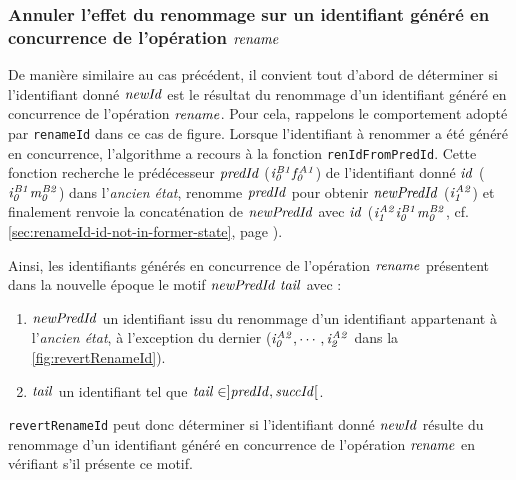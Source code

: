 \subsubsection{Annuler l'effet du renommage sur un identifiant généré en concurrence de l'opération $\mathit{rename}$}

De manière similaire au cas précédent, il convient tout d'abord de déterminer si l'identifiant donné $\mathit{newId}$ est le résultat du renommage d'un identifiant généré en concurrence de l'opération $\mathit{rename}$.
Pour cela, rappelons le comportement adopté par \texttt{renameId} dans ce cas de figure.
Lorsque l'identifiant à renommer a été généré en concurrence, l'algorithme a recours à la fonction \texttt{renIdFromPredId}.
Cette fonction recherche le prédécesseur $\mathit{predId}$ (\eg $\mathit{i}^{\mathit{B1}}_{\mathit{0}}\mathit{f}^{\mathit{A1}}_{\mathit{0}}$) de l'identifiant donné $\mathit{id}$ (\eg $\mathit{i}^{\mathit{B1}}_{\mathit{0}}\mathit{m}^{\mathit{B2}}_{\mathit{0}}$) dans l'\emph{ancien état}, renomme $\mathit{predId}$ pour obtenir $\mathit{newPredId}$ ($\mathit{i}^{\mathit{A2}}_{\mathit{1}}$) et finalement renvoie la concaténation de $\mathit{newPredId}$ avec $\mathit{id}$ ($\mathit{i}^{\mathit{A2}}_{\mathit{1}}\mathit{i}^{\mathit{B1}}_{\mathit{0}}\mathit{m}^{\mathit{B2}}_{\mathit{0}}$, cf. \autoref{sec:renameId-id-not-in-former-state}, page \pageref{sec:renameId-id-not-in-former-state}).

Ainsi, les identifiants générés en concurrence de l'opération $\mathit{rename}$ présentent dans la nouvelle époque le motif $\mathit{newPredId}~\mathit{tail}$ avec :
\begin{enumerate}
    \item $\mathit{newPredId}$ un identifiant issu du renommage d'un identifiant appartenant à l'\emph{ancien état}, à l'exception du dernier (\eg $\mathit{i}^{\mathit{A2}}_{\mathit{0}},\cdots,\mathit{i}^{\mathit{A2}}_{\mathit{2}}$ dans la \autoref{fig:revertRenameId}).
    \item $\mathit{tail}$ un identifiant tel que $\mathit{tail} \in ]\mathit{predId}, \mathit{succId}[$.
\end{enumerate}
\texttt{revertRenameId} peut donc déterminer si l'identifiant donné $\mathit{newId}$ résulte du renommage d'un identifiant généré en concurrence de l'opération $\mathit{rename}$ en vérifiant s'il présente ce motif.

